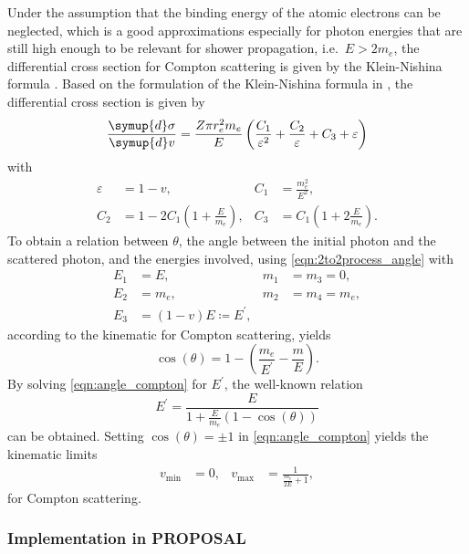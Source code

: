Under the assumption that the binding energy of the atomic electrons can be neglected, which is a good approximations especially for photon energies that are still high enough to be relevant for shower propagation, i.e.\ $E > 2 m_e$, the differential cross section for Compton scattering is given by the Klein-Nishina formula \cite{KleinNishina}.
Based on the formulation of the Klein-Nishina formula in \cite{Hirayama:2005zm}, the differential cross section is given by
%
\begin{equation}
	\frac{\symup{d}\sigma}{\symup{d}v} = \frac{Z \pi r_e^2 m_e}{E} \left( \frac{C_1}{\varepsilon^2} + \frac{C_2}{\varepsilon} + C_3 + \varepsilon \right)
\end{equation}
%
with
%
\begin{align}
	\varepsilon &= 1 - v, & C_1 &= \frac{m_e^2}{E^2}, \\
	C_2 &= 1 - 2 C_1 \left( 1 + \frac{E}{m_e} \right) , & C_3 &= C_1 \left( 1 + 2 \frac{E}{m_e} \right).
\end{align}
%
To obtain a relation between $\theta$, the angle between the initial photon and the scattered photon, and the energies involved, using \eqref{eqn:2to2process_angle} with
%
\begin{align*}
	E_1 &= E, & m_1 &= m_3 = 0, \\
	E_2 &= m_e, & m_2 &= m_4 = m_e, \\
	E_3 &= (1 - v) E \coloneqq E^{\prime},
\end{align*}
%
according to the kinematic for Compton scattering, yields
%
\begin{equation}
	\label{eqn:angle_compton}
	\cos(\theta) = 1 - \left( \frac{m_e}{E^{\prime}} - \frac{m}{E} \right).
\end{equation}
%
By solving \eqref{eqn:angle_compton} for $E^{\prime}$, the well-known relation
%
\begin{equation}
	E^{\prime} = \frac{E}{1 + \frac{E}{m_e} (1 - \cos(\theta))}
\end{equation}
%
can be obtained.
Setting $\cos(\theta) = \pm1$ in \eqref{eqn:angle_compton} yields the kinematic limits
%
\begin{align}
	v_{\text{min}} &= 0, & v_{\text{max}} &= \frac{1}{\frac{m_e}{2E} + 1},
\end{align}
%
for Compton scattering.

\subsubsection{Implementation in PROPOSAL}

